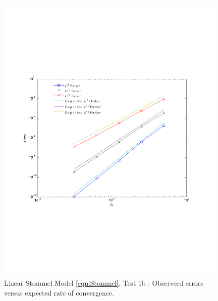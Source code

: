 \begin{figure}
  \begin{center}
    \includegraphics[scale=0.5]{figures/StommelBConvergence.pdf}
    \caption{Linear Stommel Model \eqref{eqn:Stommel}, Test 1b \cite{Vallis06}:
      Observeed errors versus expected rate of convergence.}
    \label{fig:StommelErrorsVallis1}
  \end{center}
\end{figure}

